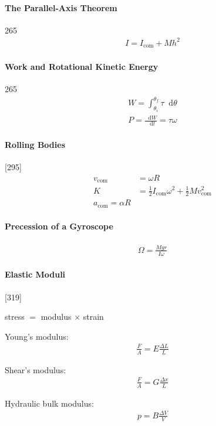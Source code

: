 \documentclass{article}
\newcommand*\diff{\mathop{}\!\mathrm{d}}
\numberwithin{equation}{subsection} %
\theoremstyle{definition}
\begin{document}
\paragraph{The Parallel-Axis Theorem} 265
\begin{align}
    I = I_{\text{com}} + M h^2
\end{align}

\paragraph{Work and Rotational Kinetic Energy} 265
\begin{align}
    W = \int_{\theta_i}^{\theta_f} \tau \diff \theta \\
    P = \frac{\diff W}{\diff t} = \tau \omega
\end{align}

\paragraph{Rolling Bodies}
[295]
\begin{align}
    v_\text{com} &= \omega R\\
    K  &= \frac{1}{2}I_\text{com}\omega^2 + \frac{1}{2}Mv_\text{com}^2
    \\
    a_\text{com} = \alpha R
\end{align}
\paragraph{Precession of a Gyroscope}
\begin{align}
    \Omega = \frac{Mgr}{I\omega}
\end{align}

\paragraph{Elastic Moduli} [319]
\begin{center}
    stress $=$ modulus $\times$ strain
\end{center}

Young's modulus:
\begin{align}
    \frac{F}{A} = E \frac{\Delta L}{L}
\end{align}

Shear's modulus:
\begin{align}
    \frac{F}{A} = G \frac{\Delta x}{L}
\end{align}

Hydraulic bulk modulus:
\begin{align}
    p = B \frac{\Delta V}{V}
\end{align}
\end{document}
